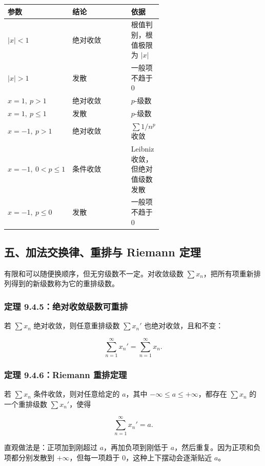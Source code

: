 \begin{center}
\small
\begin{tabularx}{\linewidth}{|>{\raggedright\arraybackslash}p{0.18\linewidth}|>{\raggedright\arraybackslash}p{0.42\linewidth}|>{\raggedright\arraybackslash}X|}
\hline
\textbf{参数} & \textbf{结论} & \textbf{依据} \\ \hline
\(|x|<1\) & 绝对收敛 & 根值判别，根值极限为 \(|x|\) \\ \hline
\(|x|>1\) & 发散 & 一般项不趋于 \(0\) \\ \hline
\(x=1,\ p>1\) & 绝对收敛 & \(p\)-级数 \\ \hline
\(x=1,\ p\le1\) & 发散 & \(p\)-级数 \\ \hline
\(x=-1,\ p>1\) & 绝对收敛 & \(\sum 1/n^p\) 收敛 \\ \hline
\(x=-1,\ 0<p\le1\) & 条件收敛 & Leibniz 收敛，但绝对值级数发散 \\ \hline
\(x=-1,\ p\le0\) & 发散 & 一般项不趋于 \(0\) \\ \hline
\end{tabularx}
\end{center}

\subsection*{五、加法交换律、重排与 Riemann 定理}

有限和可以随便换顺序，但无穷级数不一定。对收敛级数 \(\sum x_n\)，把所有项重新排列得到的新级数称为它的重排级数。

\subsubsection*{定理 9.4.5：绝对收敛级数可重排}

若 \(\sum x_n\) 绝对收敛，则任意重排级数 \(\sum x_n'\) 也绝对收敛，且和不变：

\[
      \sum_{n=1}^{\infty}x_n'
      =
      \sum_{n=1}^{\infty}x_n.
    \]

\subsubsection*{定理 9.4.6：Riemann 重排定理}

若 \(\sum x_n\) 条件收敛，则对任意给定的 \(a\)，其中 \(-\infty\le a\le+\infty\)，都存在 \(\sum x_n\) 的一个重排级数 \(\sum x_n'\)，使得

\[
      \sum_{n=1}^{\infty}x_n'=a.
    \]

直观做法是：正项加到刚超过 \(a\)，再加负项到刚低于 \(a\)，然后重复。因为正项和负项都分别发散到 \(+\infty\)，但每一项趋于 \(0\)，这种上下摆动会逐渐贴近 \(a\)。

